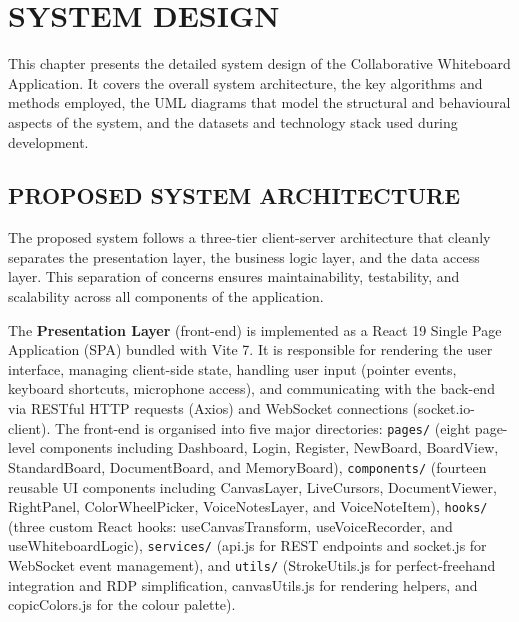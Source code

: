 \documentclass[12pt,a4paper]{report}
\begin{document}
\chapter{SYSTEM DESIGN}
\thispagestyle{empty}

This chapter presents the detailed system design of the Collaborative Whiteboard Application. It covers the overall system architecture, the key algorithms and methods employed, the UML diagrams that model the structural and behavioural aspects of the system, and the datasets and technology stack used during development.

\section{PROPOSED SYSTEM ARCHITECTURE}

The proposed system follows a three-tier client-server architecture that cleanly separates the presentation layer, the business logic layer, and the data access layer. This separation of concerns ensures maintainability, testability, and scalability across all components of the application.

The \textbf{Presentation Layer} (front-end) is implemented as a React 19 Single Page Application (SPA) bundled with Vite 7. It is responsible for rendering the user interface, managing client-side state, handling user input (pointer events, keyboard shortcuts, microphone access), and communicating with the back-end via RESTful HTTP requests (Axios) and WebSocket connections (socket.io-client). The front-end is organised into five major directories: \texttt{pages/} (eight page-level components including Dashboard, Login, Register, NewBoard, BoardView, StandardBoard, DocumentBoard, and MemoryBoard), \texttt{components/} (fourteen reusable UI components including CanvasLayer, LiveCursors, DocumentViewer, RightPanel, ColorWheelPicker, VoiceNotesLayer, and VoiceNoteItem), \texttt{hooks/} (three custom React hooks: useCanvasTransform, useVoiceRecorder, and useWhiteboardLogic), \texttt{services/} (api.js for REST endpoints and socket.js for WebSocket event management), and \texttt{utils/} (StrokeUtils.js for perfect-freehand integration and RDP simplification, canvasUtils.js for rendering helpers, and copicColors.js for the colour palette).
\end{document}
